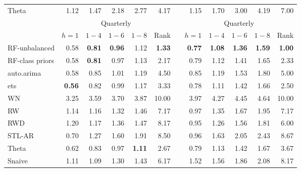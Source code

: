 \documentclass[11pt,a4paper,]{article}
\theoremstyle{definition}
\theoremstyle{definition}
\theoremstyle{definition}
\theoremstyle{remark}
\begin{document}
\begin{table}[!htbp]
\begin{tabular}{lrrrrrrrrrrr}
Theta                &       1.12 &       1.47 &       2.18 &       2.77 &       4.17 &            &       1.15 &       1.70 &       3.00 &       4.19 &       7.00 \\\cmidrule(lr){2-6} \cmidrule(lr){8-12}
           &                                 \multicolumn{ 5}{c}{Quarterly} &            &                                 \multicolumn{ 5}{c}{Quarterly} \\
                     &    $h=1$   &    $1-4$   &     $1-6$  &     $1-8$  &      Rank  &            &     $h=1$  &    $1-4$   &     $1-6$  &     $1-8$  &   Rank \\\cmidrule(lr){2-6} \cmidrule(lr){8-12}
RF-unbalanced        &       0.58 & {\bf 0.81} & {\bf 0.96} &       1.12 & {\bf 1.33} &            & {\bf 0.77} & {\bf 1.08} & {\bf 1.36} & {\bf 1.59} & {\bf 1.00} \\
RF-class priors      &       0.58 & {\bf 0.81} &       0.97 &       1.13 &       2.17 &            &       0.79 &       1.12 &       1.41 &       1.65 &       2.33 \\
auto.arima           &       0.58 &       0.85 &       1.01 &       1.19 &       4.50 &            &       0.85 &       1.19 &       1.53 &       1.80 &       5.00 \\
ets                  & {\bf 0.56} &       0.82 &       0.99 &       1.17 &       3.33 &            &       0.78 &       1.11 &       1.42 &       1.66 &       2.50 \\
WN                   &       3.25 &       3.59 &       3.70 &       3.87 &      10.00 &            &       3.97 &       4.27 &       4.45 &       4.64 &      10.00 \\
RW                   &       1.14 &       1.16 &       1.32 &       1.46 &       7.17 &            &       0.97 &       1.35 &       1.67 &       1.95 &       7.17 \\
RWD                  &       1.20 &       1.17 &       1.36 &       1.47 &       8.17 &            &       0.95 &       1.26 &       1.56 &       1.81 &       6.00 \\
STL-AR               &       0.70 &       1.27 &       1.60 &       1.91 &       8.50 &            &       0.96 &       1.63 &       2.05 &       2.43 &       8.67 \\
Theta                &       0.62 &       0.83 &       0.97 & {\bf 1.11} &       2.67 &            &       0.79 &       1.13 &       1.42 &       1.67 &       3.67 \\
Snaive               &       1.11 &       1.09 &       1.30 &       1.43 &       6.17 &            &       1.52 &       1.56 &       1.86 &       2.08 &       8.17 \\\cmidrule(lr){2-6} \cmidrule(lr){8-12}

\end{tabular}
\end{table}
\end{document}
